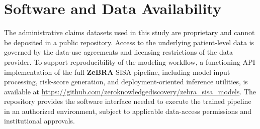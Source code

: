 \documentclass[onecolumn, compsoc,11pt]{IEEEtran}
\def\zebra{\textbf{ZeBRA}\xspace}
\begin{document}
\section*{Software and Data Availability}
The administrative claims datasets used in this study are proprietary and cannot be deposited in a public repository. Access to the underlying patient-level data is governed by the data-use agreements and licensing restrictions of the data provider. To support reproducibility of the modeling workflow, a functioning API implementation of the full \zebra SISA pipeline, including model input processing, risk-score generation, and deployment-oriented inference utilities, is available at \url{https://github.com/zeroknowledgediscovery/zebra_sisa_models}. The repository provides the software interface needed to execute the trained pipeline in an authorized environment, subject to applicable data-access permissions and institutional approvals.





\clearpage

\setcounter{page}{1}
\setcounter{figure}{0}
\renewcommand{\thefigure}{S\arabic{figure}}
\setcounter{table}{0}
\renewcommand{\thetable}{S\arabic{table}}






%

%





\end{document}
